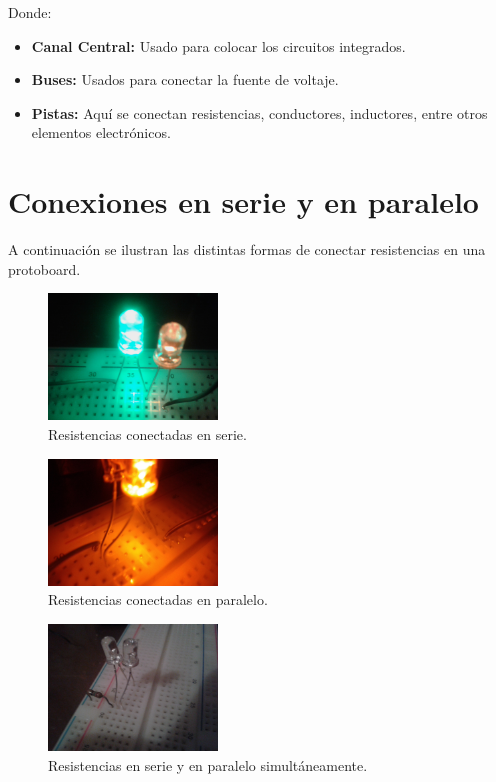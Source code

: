 \documentclass{scrartcl}
\begin{document}
Donde:

\begin{itemize}
	\item \textbf{Canal Central:} Usado para colocar los circuitos integrados. 
	\item \textbf{Buses:} Usados para conectar la fuente de voltaje.
	\item \textbf{Pistas:} Aquí se conectan resistencias, conductores, inductores, entre otros elementos electrónicos.

\end{itemize}

\section{Conexiones en serie y en paralelo}

A continuación se ilustran las distintas formas de conectar resistencias en una protoboard.
\\

\begin{figure}[h!]
	\centering
	\includegraphics[width=0.4\textwidth,height=0.17\textheight]{serie}
	\caption{Resistencias conectadas en serie.}
\end{figure}

\begin{figure}[h!]
	\centering
	\includegraphics[width=0.4\textwidth,height=0.17\textheight]{paralelo}
	\caption{Resistencias conectadas en paralelo.}
\end{figure}

\begin{figure}[h!]
	\centering
	\includegraphics[width=0.4\textwidth,height=0.17\textheight]{mixto}
	\caption{Resistencias en serie y en paralelo simultáneamente.}
\end{figure}
\end{document}
